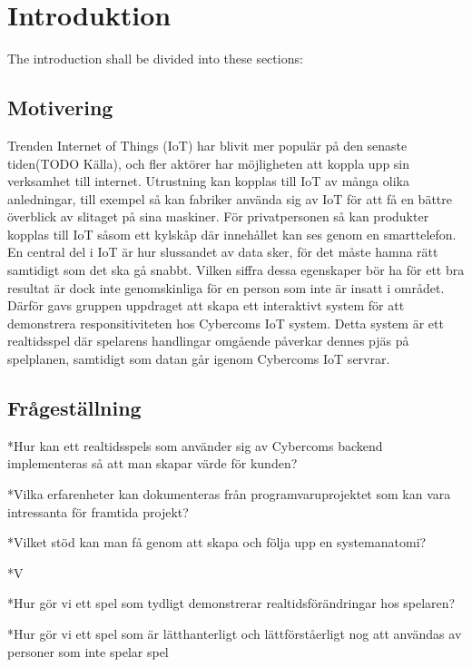 \chapter{Introduktion}
\label{cha:introduction}

The introduction shall be divided into these sections:

\section{Motivering}
\label{sec:motivation}


Trenden Internet of Things (IoT) har blivit mer populär på den senaste tiden(TODO Källa), och fler aktörer har möjligheten att koppla upp sin verksamhet till internet. Utrustning kan kopplas till IoT av många olika anledningar, till exempel så kan fabriker använda sig av IoT för att få en bättre överblick av slitaget på sina maskiner. För privatpersonen så kan produkter kopplas till IoT såsom ett kylskåp där innehållet kan ses genom en smarttelefon. En central del i IoT är hur slussandet av data sker, för det måste hamna rätt samtidigt som det ska gå snabbt. Vilken siffra dessa egenskaper bör ha för ett bra resultat är dock inte genomskinliga för en person som inte är insatt i området. Därför gavs gruppen uppdraget att skapa ett interaktivt system för att demonstrera responsitiviteten hos Cybercoms IoT system. Detta system är ett realtidsspel där spelarens handlingar omgående påverkar dennes pjäs på spelplanen, samtidigt som datan går igenom Cybercoms IoT servrar.



\section{Frågeställning}


*Hur kan ett realtidsspels som använder sig av Cybercoms backend implementeras så att man skapar värde för kunden?

*Vilka erfarenheter kan dokumenteras från programvaruprojektet som kan vara intressanta för framtida projekt?

*Vilket stöd kan man få genom att skapa och följa upp en systemanatomi?

*V




*Hur gör vi ett spel som tydligt demonstrerar realtidsförändringar hos spelaren?

*Hur gör vi ett spel som är lätthanterligt och lättförståerligt nog att användas av personer som inte spelar spel

